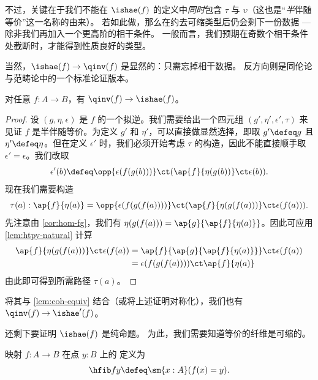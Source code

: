 不过，关键在于我们不能在 $\ishae (f)$ 的定义中\emph{同时}包含 $\tau$ 与 $\upsilon$（这也是“\emph{半}伴随等价”这一名称的由来）。
若如此做，那么在约去可缩类型后仍会剩下一份数据 --- 除非我们再加入一个更高阶的相干条件。
一般而言，我们预期在奇数个相干条件处截断时，才能得到性质良好的类型。

当然，$\ishae(f) \to\qinv(f)$ 是显然的：只需忘掉相干数据。
反方向则是同伦论与范畴论中的一个标准论证版本。

\begin{thm}\label{thm:equiv-iso-adj}
  对任意 $f:A\to B$，有 $\qinv(f)\to\ishae(f)$。
\end{thm}
\begin{proof}
设 $(g,\eta,\epsilon)$ 是 $f$ 的一个拟逆。我们需要给出一个四元组 $(g',\eta',\epsilon',\tau)$ 来见证 $f$ 是半伴随等价。为定义 $g'$ 和 $\eta'$，可以直接做显然选择，即取 $g'
\defeq g$ 且 $\eta'\defeq \eta$。但在定义 $\epsilon'$ 时，我们必须开始考虑 $\tau$ 的构造，因此不能直接顺手取 $\epsilon'=\epsilon$。我们改取
\begin{equation*}
\epsilon'(b) \defeq \opp{\epsilon(f(g(b)))}\ct (\ap{f}{\eta(g(b))}\ct \epsilon(b)).
\end{equation*}
现在我们需要构造
\begin{equation*}
\tau(a): \ap{f}{\eta(a)}=\opp{\epsilon(f(g(f(a))))}\ct (\ap{f}{\eta(g(f(a)))}\ct \epsilon(f(a))).
\end{equation*}
先注意由 \cref{cor:hom-fg}，我们有
$\eta(g(f(a)))=\ap{g}{\ap{f}{\eta(a)}}$。因此可应用
\cref{lem:htpy-natural} 计算
\begin{align*}
\ap{f}{\eta(g(f(a)))}\ct \epsilon(f(a))
& = \ap{f}{\ap{g}{\ap{f}{\eta(a)}}}\ct \epsilon(f(a))\\
& = \epsilon(f(g(f(a))))\ct \ap{f}{\eta(a)}
\end{align*}
由此即可得到所需路径 $\tau(a)$。
\end{proof}

将其与 \cref{lem:coh-equiv} 结合（或将上述证明对称化），我们也有 $\qinv(f)\to\ishae'(f)$。

还剩下要证明 $\ishae(f)$ 是纯命题。
为此，我们需要知道等价的纤维是可缩的。

\begin{defn}\label{defn:homotopy-fiber}
  映射 $f:A\to B$ 在点 $y:B$ 上的
  定义为
  \[ \hfib f y \defeq \sm{x:A} (f(x) = y).\]
\end{defn}

